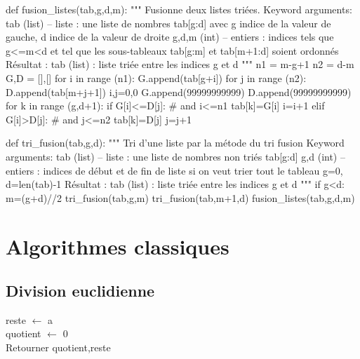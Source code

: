 \documentclass[10pt]{article}
\begin{document}
\begin{py}
\begin{python}
def fusion_listes(tab,g,d,m):
    """
    Fusionne deux listes triées.
    Keyword arguments:
    tab (list) -- liste : une liste de nombres tab[g:d] avec g indice de la 
    valeur de gauche, d indice de la valeur de droite
    g,d,m (int) -- entiers : indices tels que g<=m<d et tel que les 
    sous-tableaux tab[g:m] et tab[m+1:d] soient ordonnés
    Résultat :
    tab (list) : liste triée entre les indices g et d
    """
    n1 = m-g+1
    n2 = d-m
    G,D = [],[]
    for i in range (n1):
        G.append(tab[g+i])
    for j in range (n2):
        D.append(tab[m+j+1])
    i,j=0,0
    G.append(99999999999)
    D.append(99999999999)
    for k in range (g,d+1):
        if G[i]<=D[j]: # and i<=n1 
            tab[k]=G[i]
            i=i+1
        elif G[i]>D[j]: # and j<=n2
            tab[k]=D[j]
            j=j+1
            
def tri_fusion(tab,g,d):
    """
    Tri d'une liste par la métode du tri fusion
    Keyword arguments:
    tab (list) -- liste : une liste de nombres non triés tab[g:d]
    g,d (int) -- entiers : indices de début et de fin de liste si on veut trier
                           tout le tableau g=0, d=len(tab)-1
    Résultat :
    tab (list) : liste triée entre les indices g et d
    """
    if g<d:
        m=(g+d)//2
        tri_fusion(tab,g,m)
        tri_fusion(tab,m+1,d)
        fusion_listes(tab,g,d,m)
\end{python}
\end{py}

\section{Algorithmes classiques}
\subsection{Division euclidienne}
\begin{pseudo}
\begin{algorithm}[H]
reste $\gets$ a\\
quotient $\gets$ 0\\
Retourner quotient,reste
\end{algorithm}
\end{pseudo}
\end{document}
